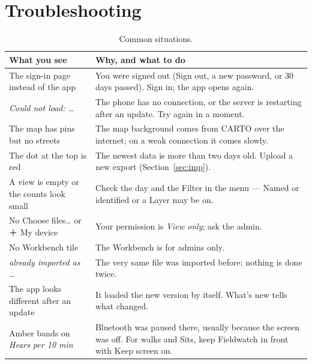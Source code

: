 \documentclass[10pt,a4paper]{article}
\newcommand{\ui}[1]{\textsf{\small #1}}            %
\begin{document}
\section{Troubleshooting}\label{sec:trouble}
\begin{table}[H]\small\centering
\caption{Common situations.}
\begin{tabularx}{\textwidth}{>{\raggedright}p{4.6cm}X}
\toprule
\textbf{What you see} & \textbf{Why, and what to do}\\
\midrule
The sign-in page instead of the app & You were signed out (\ui{Sign out}, a new password, or 30 days passed). Sign in; the app opens again.\\
\emph{Could not load: \dots} & The phone has no connection, or the server is restarting after an update. Try again in a moment.\\
The map has pins but no streets & The map background comes from CARTO over the internet; on a weak connection it comes slowly.\\
The dot at the top is red & The newest data is more than two days old. Upload a new export (Section~\ref{sec:imp}).\\
A view is empty or the counts look small & Check the day and the Filter in the menu --- \ui{Named or identified} or a \ui{Layer} may be on.\\
No \ui{Choose files…} or \ui{＋ My device} & Your permission is \emph{View only}; ask the admin.\\
No Workbench tile & The Workbench is for admins only.\\
\emph{already imported as \dots} & The very same file was imported before; nothing is done twice.\\
The app looks different after an update & It loaded the new version by itself. \ui{What's new} tells what changed.\\
Amber bands on \emph{Hears per 10 min} & Bluetooth was paused there, usually because the screen was off. For walks and Sits, keep Fieldwatch in front with \ui{Keep screen on}.\\
\bottomrule
\end{tabularx}
\end{table}

\end{document}
